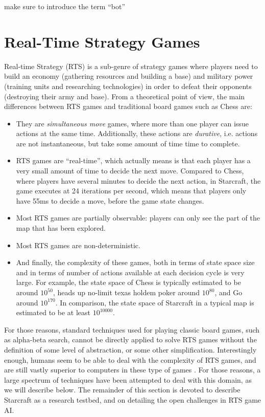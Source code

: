 \documentclass[journal]{IEEEtran}
\begin{document}
{\color{red} make sure to introduce the term ``bot''}

\section{Real-Time Strategy Games}\label{sec:rts}

Real-time Strategy (RTS) is a sub-genre of strategy games where players need to build an economy (gathering resources and building a base) and military power (training units and researching technologies) in order to defeat their opponents (destroying their army and base). From a theoretical point of view, the main differences between RTS games and traditional board games such as Chess are:

\begin{itemize}
\item They are {\em simultaneous move} games, where more than one player can issue actions at the same time. Additionally, these actions are {\em durative}, i.e. actions are not instantaneous, but take some amount of time time to complete.
\item RTS games are ``real-time'', which actually means is that each player has a very small amount of time to decide the next move. Compared to Chess, where players have several minutes to decide the next action, in Starcraft, the game executes at 24 iterations per second, which means that players only have 55ms to decide a move, before the game state changes.
\item Most RTS games are partially observable: players can only see the part of the map that has been explored.
\item Most RTS games are non-deterministic.
\item And finally, the complexity of these games, both in terms of state space size and in terms of number of actions available at each decision cycle is very large. For example, the state space of Chess is typically estimated to be around $10^{50}$, heads up no-limit texas holdem poker around $10^{80}$, and Go around $10^{170}$. In comparison, the state space of Starcraft in a typical map is estimated to be at least {\color{red} $10^{10000}$.}
\end{itemize}

For those reasons, standard techniques used for playing classic board games, such as alpha-beta search, cannot be directly applied to solve RTS games without the definition of some level of abstraction, or some other simplification. Interestingly enough, humans seem to be able to deal with the complexity of RTS games, and are still vastly superior to computers in these type of games \cite{burochurchill2012aimagazine}. For those reasons, a large spectrum of techniques have been attempted to deal with this domain, as we will describe below. The remainder of this section is devoted to describe Starcraft as a research testbed, and on detailing the open challenges in RTS game AI.
\end{document}
